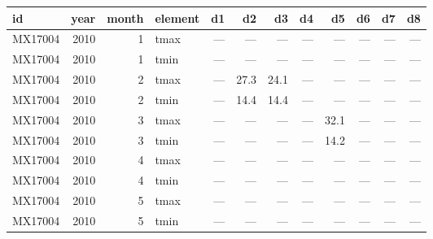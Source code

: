 \begin{tabular}{lrrlrrrrrrrr}
  \toprule
 id & year & month & element & d1 & d2 & d3 & d4 & d5 & d6 & d7 & d8 \\ 
  \midrule
  MX17004 & 2010 &  1 & tmax & --- & --- & --- & --- & --- & --- & --- & --- \\ 
  MX17004 & 2010 &  1 & tmin & --- & --- & --- & --- & --- & --- & --- & --- \\ 
  MX17004 & 2010 &  2 & tmax & --- & 27.3 & 24.1 & --- & --- & --- & --- & --- \\ 
  MX17004 & 2010 &  2 & tmin & --- & 14.4 & 14.4 & --- & --- & --- & --- & --- \\ 
  MX17004 & 2010 &  3 & tmax & --- & --- & --- & --- & 32.1 & --- & --- & --- \\ 
  MX17004 & 2010 &  3 & tmin & --- & --- & --- & --- & 14.2 & --- & --- & --- \\ 
  MX17004 & 2010 &  4 & tmax & --- & --- & --- & --- & --- & --- & --- & --- \\ 
  MX17004 & 2010 &  4 & tmin & --- & --- & --- & --- & --- & --- & --- & --- \\ 
  MX17004 & 2010 &  5 & tmax & --- & --- & --- & --- & --- & --- & --- & --- \\ 
  MX17004 & 2010 &  5 & tmin & --- & --- & --- & --- & --- & --- & --- & --- \\ 
   \bottomrule
\end{tabular}
